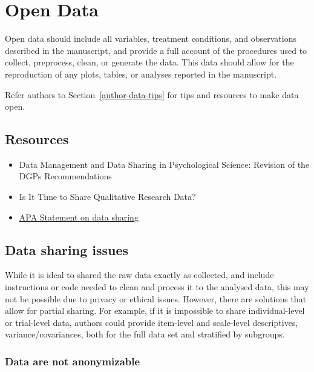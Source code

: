 \documentclass[
  oneside]{book}
\providecommand{\tightlist}{%
  \setlength{\itemsep}{0pt}\setlength{\parskip}{0pt}}
\begin{document}
\hypertarget{open-data}{%
\chapter{Open Data}\label{open-data}}

Open data should include all variables, treatment conditions, and observations described in the manuscript, and provide a full account of the procedures used to collect, preprocess, clean, or generate the data. This data should allow for the reproduction of any plots, tables, or analyses reported in the manuscript.

Refer authors to Section~\ref{author-data-tips} for tips and resources to make data open.

\hypertarget{resources-3}{%
\section{Resources}\label{resources-3}}

\begin{itemize}
\tightlist
\item
  Data Management and Data Sharing in Psychological Science: Revision of the DGPs Recommendations \citep{gollwitzer_2020}
\item
  Is It Time to Share Qualitative Research Data? \citep{dubois2018time}
\item
  \href{https://www.apa.org/pubs/journals/resources/data-sharing}{APA Statement on data sharing}
\end{itemize}

\hypertarget{data-sharing-issues}{%
\section{Data sharing issues}\label{data-sharing-issues}}

While it is ideal to shared the raw data exactly as collected, and include instructions or code needed to clean and process it to the analysed data, this may not be possible due to privacy or ethical issues. However, there are solutions that allow for partial sharing. For example, if it is impossible to share individual-level or trial-level data, authors could provide item-level and scale-level descriptives, variance/covariances, both for the full data set and stratified by subgroups.

\hypertarget{data-are-not-anonymizable}{%
\subsection{Data are not anonymizable}\label{data-are-not-anonymizable}}
\end{document}
